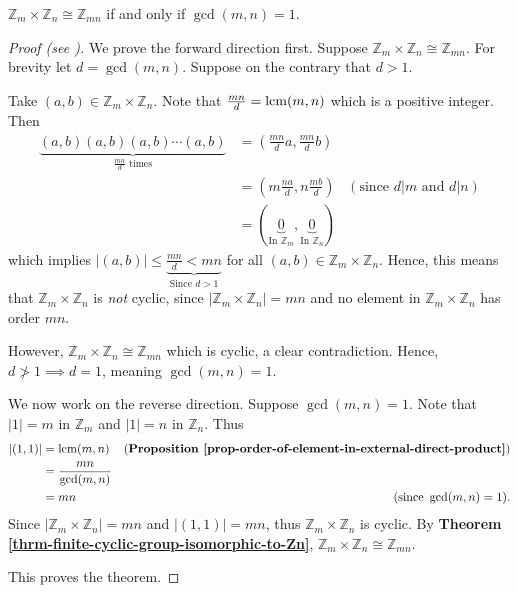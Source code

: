 \begin{theorem}\label{thrm-Zm-cross-Zn-isomorphic-to-Zmn-condition}
    $\mathbb{Z}_m \times \mathbb{Z}_n \cong \mathbb{Z}_{mn}$ if and only if $\gcd(m,n) = 1$.
\end{theorem}
\begin{proof}[Proof (see {\cite[Proposition 13.1 (3)]{humphreys_1996}})]
    We prove the forward direction first. Suppose $\mathbb{Z}_m \times \mathbb{Z}_n \cong \mathbb{Z}_{mn}$. For brevity let $d = \gcd(m,n)$. Suppose on the contrary that $d > 1$.

    Take $(a, b) \in \mathbb{Z}_m \times \mathbb{Z}_n$. Note that $\frac{mn}{d} = \mathrm{lcm}(m,n)$ which is a positive integer. Then
    \begin{align*}
        \underbrace{(a,b)(a,b)(a,b)\cdots(a,b)}_{\frac{mn}{d}\text{ times}} &= \left(\frac{mn}{d}a, \frac{mn}{d}b\right)\\
        &= \left(m\frac{na}{d}, n\frac{mb}{d}\right) & (\text{since } d | m \text{ and } d | n)\\
        &= (\underbrace{0}_{\text{In } \mathbb{Z}_m}, \underbrace{0}_{\text{In } \mathbb{Z}_n})
    \end{align*}
    which implies $|(a, b)| \leq \underbrace{\frac{mn}{d} < mn}_{\text{Since } d > 1}$ for all $(a, b) \in \mathbb{Z}_m \times \mathbb{Z}_n$. Hence, this means that $\mathbb{Z}_m \times \mathbb{Z}_n$ is \textit{not} cyclic, since $|\mathbb{Z}_m \times \mathbb{Z}_n| = mn$ and no element in $\mathbb{Z}_m \times \mathbb{Z}_n$ has order $mn$.

    However, $\mathbb{Z}_m \times \mathbb{Z}_n \cong \mathbb{Z}_{mn}$ which is cyclic, a clear contradiction. Hence, $d \not>1 \implies d = 1$, meaning $\gcd(m,n) = 1$.

    We now work on the reverse direction. Suppose $\gcd(m,n) = 1$. Note that $|1| = m$ in $\mathbb{Z}_m$ and $|1| = n$ in $\mathbb{Z}_n$. Thus
    \begin{align*}
        |(1, 1)| &= \mathrm{lcm}(m, n) & (\text{\textbf{Proposition \ref{prop-order-of-element-in-external-direct-product}}})\\
        &= \frac{mn}{\gcd(m,n)}\\
        &= mn & (\text{since }\gcd(m,n) = 1).
    \end{align*}
    Since $|\mathbb{Z}_m \times \mathbb{Z}_n| = mn$ and $|(1,1)| = mn$, thus $\mathbb{Z}_m \times \mathbb{Z}_n$ is cyclic. By \textbf{Theorem \ref{thrm-finite-cyclic-group-isomorphic-to-Zn}}, $\mathbb{Z}_m \times \mathbb{Z}_n \cong \mathbb{Z}_{mn}$.

    This proves the theorem.
\end{proof}

